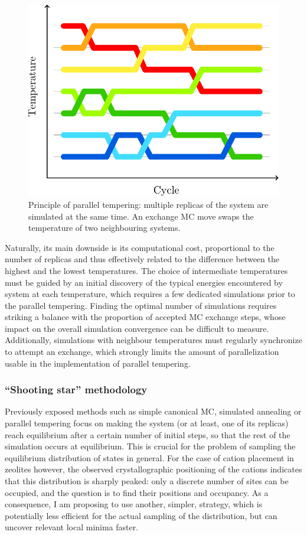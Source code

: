 \documentclass[main.tex]{subfiles}
\begin{document}
\begin{figure}
	\centering
	\includegraphics[width=0.8\linewidth]{figures/cations/paralleltempering_principle.pdf}
	\caption{Principle of parallel tempering: multiple replicas of the system are simulated at the same time. An exchange MC move swaps the temperature of two neighbouring systems.}\label{fig:paralleltempering_principle}
\end{figure}

Naturally, its main downside is its computational cost, proportional to the number of replicas and thus effectively related to the difference between the highest and the lowest temperatures. The choice of intermediate temperatures must be guided by an initial discovery of the typical energies encountered by system at each temperature, which requires a few dedicated simulations prior to the parallel tempering. Finding the optimal number of simulations requires striking a balance with the proportion of accepted MC exchange steps, whose impact on the overall simulation convergence can be difficult to measure. Additionally, simulations with neighbour temperatures must regularly synchronize to attempt an exchange, which strongly limits the amount of parallelization usable in the implementation of parallel tempering.

\subsubsection{``Shooting star'' methodology}

Previously exposed methods such as simple canonical MC, simulated annealing or parallel tempering focus on making the system (or at least, one of its replicas) reach equilibrium after a certain number of initial steps, so that the rest of the simulation occurs at equilibrium. This is crucial for the problem of sampling the equilibrium distribution of states in general. For the case of cation placement in zeolites however, the observed crystallographic positioning of the cations indicates that this distribution is sharply peaked: only a discrete number of sites can be occupied, and the question is to find their positions and occupancy. As a consequence, I am proposing to use another, simpler, strategy, which is potentially less efficient for the actual sampling of the distribution, but can uncover relevant local minima faster.
\end{document}
